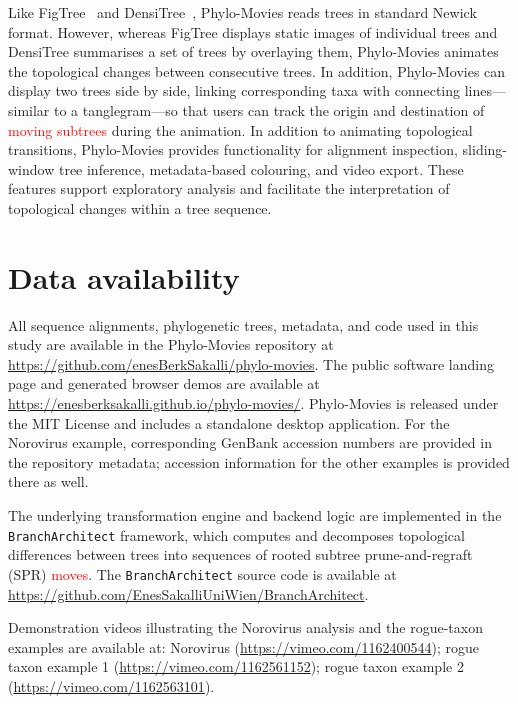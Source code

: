 Like FigTree~\citep{Rambaut2006Figtree} and DensiTree~\citep{Bouckaert2010}, Phylo-Movies reads trees in standard Newick format. However, whereas FigTree displays static images of individual trees and DensiTree summarises a set of trees by overlaying them, Phylo-Movies animates the topological changes between consecutive trees. In addition, Phylo-Movies can display two trees side by side, linking corresponding taxa with connecting lines---similar to a tanglegram\citep{Page2002}---so that users can track the origin and destination of \textcolor{red}{moving subtrees} during the animation. In addition to animating topological transitions, Phylo-Movies provides functionality for alignment inspection, sliding-window tree inference, metadata-based colouring, and video export. These features support exploratory analysis and facilitate the interpretation of topological changes within a tree sequence.

\section*{Data availability}
All sequence alignments, phylogenetic trees, metadata, and code used in this study are available in the Phylo-Movies repository at \url{https://github.com/enesBerkSakalli/phylo-movies}. The public software landing page and generated browser demos are available at \url{https://enesberksakalli.github.io/phylo-movies/}. Phylo-Movies is released under the MIT License and includes a standalone desktop application. For the Norovirus example, corresponding GenBank accession numbers are provided in the repository metadata; accession information for the other examples is provided there as well.

The underlying transformation engine and backend logic are implemented in the \texttt{BranchArchitect} framework, which computes and decomposes topological differences between trees into sequences of rooted subtree prune-and-regraft (SPR) \textcolor{red}{moves}. The \texttt{BranchArchitect} source code is available at \url{https://github.com/EnesSakalliUniWien/BranchArchitect}.

Demonstration videos illustrating the Norovirus analysis and the rogue-taxon examples are available at: Norovirus (\url{https://vimeo.com/1162400544}); rogue taxon example 1 (\url{https://vimeo.com/1162561152}); rogue taxon example 2 (\url{https://vimeo.com/1162563101}).

